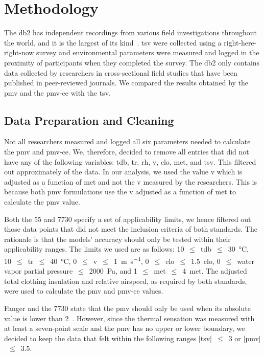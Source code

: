 \section{Methodology}\label{sec:methodology}
The \ac{db2} has  independent recordings from various field investigations throughout the world, and it is the largest of its kind~\cite{FoldvaryLicina2018, db2dryad}.
\Ac{tsv} were collected using a right-here-right-now survey and environmental parameters were measured and logged in the proximity of participants when they completed the survey.
The \ac{db2} only contains data collected by researchers in cross-sectional field studies that have been published in peer-reviewed journals.
 We compared the results obtained by the \ac{pmv} and the \ac{pmv-ce} with the \ac{tsv}.

\subsection{Data Preparation and Cleaning}\label{subsec:data-processing-and-cleaning}
Not all researchers measured and logged all six parameters needed to calculate the \ac{pmv} and \ac{pmv-ce}.
We, therefore, decided to remove all entries that did not have any of the following variables: \ac{tdb}, \ac{tr}, \ac{rh}, \ac{v}, \ac{clo}, \ac{met}, and \ac{tsv}.
This filtered out approximately  of the data.
In our analysis, we used the value \ac{v} which is adjusted as a function of \ac{met} and not the \ac{v} measured by the researchers.
This is because both \ac{pmv} formulations use the \ac{v} adjusted as a function of \ac{met} to calculate the \ac{pmv} value.

Both the \gls{55} and \gls{7730} specify a set of applicability limits, we hence filtered out those data points that did not meet the inclusion criteria of both standards.
The rationale is that the models' accuracy should only be tested within their applicability ranges.
The limits we used are as follows:
\num{10}~$\leq$~\ac{tdb}~$\leq$~\qty{30}{\celsius},
\num{10}~$\leq$~\ac{tr}~$\leq$~\qty{40}{\celsius},
\num{0}~$\leq$~\ac{v}~$\leq$~\qty{1}{\m\per\s},
\num{0}~$\leq$~\ac{clo}~$\leq$~\qty{1.5}{clo},
\num{0}~$\leq$~water vapor partial pressure~$\leq$~\qty{2000}{\pascal},
and \num{1}~$\leq$~\ac{met}~$\leq$~\qty{4}{met}.
The adjusted total clothing insulation and relative airspeed, as required by both standards, were used to calculate the \ac{pmv} and \ac{pmv-ce} values.

Fanger and the \gls{7730} state that the \ac{pmv} should only be used when its absolute value is lower than 2~\cite{Fanger1970, iso7730}.
However, since the thermal sensation was measured with at least a seven-point scale and the \ac{pmv} has no upper or lower boundary, we decided to keep the data that felt within the following ranges $|$\ac{tsv}$|$~$\leq$~\num{3} or $|$\ac{pmv}$|$~$\leq$~\num{3.5}.

